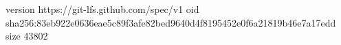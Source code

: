 version https://git-lfs.github.com/spec/v1
oid sha256:83eb922e0636eae5c89f3afe82bed9640d4f8195452e0f6a21819b46e7a17edd
size 43802
